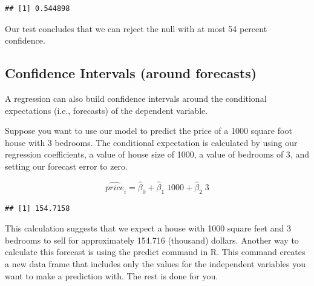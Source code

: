 \documentclass[
]{book}
\newenvironment{Shaded}{\begin{snugshade}}{\end{snugshade}}
\newcommand{\AttributeTok}[1]{\textcolor[rgb]{0.13,0.29,0.53}{#1}}
\newcommand{\DecValTok}[1]{\textcolor[rgb]{0.00,0.00,0.81}{#1}}
\newcommand{\FunctionTok}[1]{\textcolor[rgb]{0.13,0.29,0.53}{\textbf{#1}}}
\newcommand{\NormalTok}[1]{#1}
\newcommand{\OtherTok}[1]{\textcolor[rgb]{0.56,0.35,0.01}{#1}}
\newcommand{\SpecialCharTok}[1]{\textcolor[rgb]{0.81,0.36,0.00}{\textbf{#1}}}
\begin{document}
\begin{verbatim}
## [1] 0.544898
\end{verbatim}

Our test concludes that we can reject the null with at most 54 percent confidence.

\subsection{Confidence Intervals (around forecasts)}\label{confidence-intervals-around-forecasts-1}

A regression can also build confidence intervals around the conditional expectations (i.e., forecasts) of the dependent variable.

Suppose you want to use our model to predict the price of a 1000 square foot house with 3 bedrooms. The conditional expectation is calculated by using our regression coefficients, a value of house size of 1000, a value of bedrooms of 3, and setting our forecast error to zero.

\[\widehat{price}_i=\hat{\beta}_0+\hat{\beta}_1\;1000+\hat{\beta}_2\;3\]

\begin{Shaded}
\end{Shaded}

\begin{verbatim}
## [1] 154.7158
\end{verbatim}

This calculation suggests that we expect a house with 1000 square feet and 3 bedrooms to sell for approximately 154.716 (thousand) dollars. Another way to calculate this forecast is using the predict command in R. This command creates a new data frame that includes only the values for the independent variables you want to make a prediction with. The rest is done for you.
\end{document}
